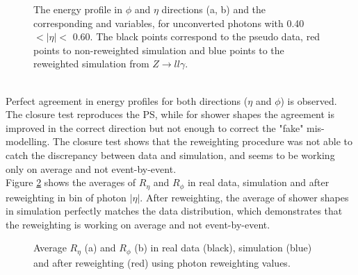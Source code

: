 \begin{figure}[htbp]
	\begin{tcolorbox}[colback=black!5!white,colframe=white!75!black]
    \caption{The energy profile in $\phi$ and $\eta$ directions (a, b) and the corresponding \Rphi and \Reta variables, for unconverted photons with 0.40 $ < |\eta| < $ 0.60. The black points correspond to the pseudo data, red points to non-reweighted simulation and blue points to the reweighted simulation from $Z\rightarrow ll\gamma$.}
    \label{fig:gamma:ss:reweighting:photon:closure}
    \end{tcolorbox}
    
\end{figure}
\\
Perfect agreement in energy profiles for both directions ($\eta$ and $\phi$) is observed. The closure test reproduces the PS, while for shower shapes the agreement is improved in the correct direction but not enough to correct the "fake" mis-modelling. The closure test shows that the reweighting procedure was not able to catch the discrepancy between data and simulation, and seems to be working only on average and not event-by-event. \\
Figure \ref{fig:gamma:ss:reweighting:photon:closure:avg} shows the averages of $R_{\eta}$ and $R_{\phi}$ in real data, simulation and after reweighting in bin of photon $|\eta|$. After reweighting, the average of shower shapes in simulation perfectly matches the data distribution, which demonstrates that the reweighting is working on average and not event-by-event.

\begin{figure}[htbp]
    \centering
    \begin{tcolorbox}[colback=black!5!white,colframe=white!75!black]
    \caption{Average $R_{\eta}$ (a) and $R_{\phi}$ (b) in real data (black), simulation (blue) and after reweighting (red) using photon reweighting values.}
    \label{fig:gamma:ss:reweighting:photon:closure:avg}
    \end{tcolorbox}
\end{figure}

